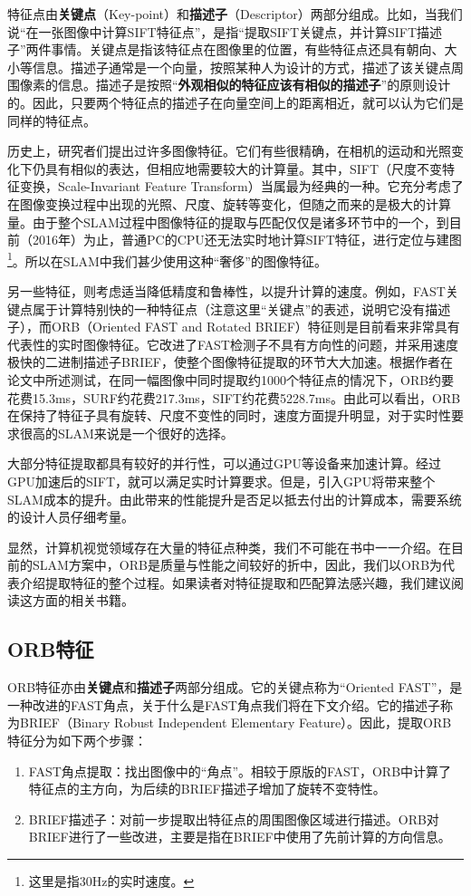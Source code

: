 特征点由\textbf{关键点}（Key-point）和\textbf{描述子}（Descriptor）两部分组成。比如，当我们说“在一张图像中计算SIFT特征点”，是指“提取SIFT关键点，并计算SIFT描述子”两件事情。关键点是指该特征点在图像里的位置，有些特征点还具有朝向、大小等信息。描述子通常是一个向量，按照某种人为设计的方式，描述了该关键点周围像素的信息。描述子是按照“\textbf{外观相似的特征应该有相似的描述子}”的原则设计的。因此，只要两个特征点的描述子在向量空间上的距离相近，就可以认为它们是同样的特征点。

历史上，研究者们提出过许多图像特征。它们有些很精确，在相机的运动和光照变化下仍具有相似的表达，但相应地需要较大的计算量。其中，SIFT（尺度不变特征变换，Scale-Invariant Feature Transform）当属最为经典的一种。它充分考虑了在图像变换过程中出现的光照、尺度、旋转等变化，但随之而来的是极大的计算量。由于整个SLAM过程中图像特征的提取与匹配仅仅是诸多环节中的一个，到目前（2016年）为止，普通PC的CPU还无法实时地计算SIFT特征，进行定位与建图\footnote{这里是指30Hz的实时速度。}。所以在SLAM中我们甚少使用这种“奢侈”的图像特征。

另一些特征，则考虑适当降低精度和鲁棒性，以提升计算的速度。例如，FAST关键点属于计算特别快的一种特征点（注意这里“关键点”的表述，说明它没有描述子），而ORB（Oriented FAST and Rotated BRIEF）特征则是目前看来非常具有代表性的实时图像特征。它改进了FAST检测子\textsuperscript{\cite{Rosten2006}}不具有方向性的问题，并采用速度极快的二进制描述子BRIEF\textsuperscript{\cite{calonder2010brief}}，使整个图像特征提取的环节大大加速。根据作者在论文中所述测试，在同一幅图像中同时提取约1000个特征点的情况下，ORB约要花费15.3ms，SURF约花费217.3ms，SIFT约花费5228.7ms。由此可以看出，ORB在保持了特征子具有旋转、尺度不变性的同时，速度方面提升明显，对于实时性要求很高的SLAM来说是一个很好的选择。

大部分特征提取都具有较好的并行性，可以通过GPU等设备来加速计算。经过GPU加速后的SIFT，就可以满足实时计算要求。但是，引入GPU将带来整个SLAM成本的提升。由此带来的性能提升是否足以抵去付出的计算成本，需要系统的设计人员仔细考量。

显然，计算机视觉领域存在大量的特征点种类，我们不可能在书中一一介绍。在目前的SLAM方案中，ORB是质量与性能之间较好的折中，因此，我们以ORB为代表介绍提取特征的整个过程。如果读者对特征提取和匹配算法感兴趣，我们建议阅读这方面的相关书籍\cite{Nixon2012}。

\subsection{ORB特征}

ORB特征亦由\textbf{关键点}和\textbf{描述子}两部分组成。它的关键点称为“Oriented FAST”，是一种改进的FAST角点，关于什么是FAST角点我们将在下文介绍。它的描述子称为BRIEF（Binary Robust Independent Elementary Feature）。因此，提取ORB特征分为如下两个步骤：
\begin{enumerate}
\item FAST角点提取：找出图像中的“角点”。相较于原版的FAST，ORB中计算了特征点的主方向，为后续的BRIEF描述子增加了旋转不变特性。
\item BRIEF描述子：对前一步提取出特征点的周围图像区域进行描述。ORB对BRIEF进行了一些改进，主要是指在BRIEF中使用了先前计算的方向信息。
\end{enumerate}

